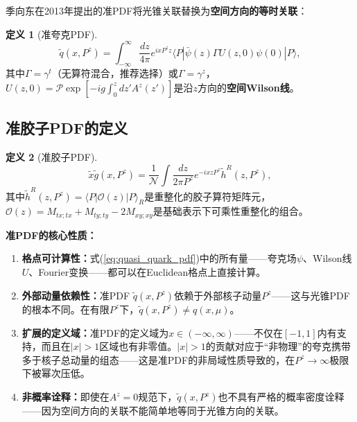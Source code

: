 \documentclass[12pt,a4paper]{ctexart}
\theoremstyle{definition}
\newtheorem{definition}{定义}[section]
\begin{document}
季向东在2013年提出的准PDF\cite{Ji2013Euclidean}将光锥关联替换为\textbf{空间方向的等时关联}：

\begin{definition}[准夸克PDF]
\begin{equation}
\boxed{\tilde{q}(x, P^z) = \int_{-\infty}^{\infty} \frac{dz}{4\pi} e^{ixP^z z} \langle P| \bar{\psi}(z) \Gamma U(z, 0) \psi(0) |P\rangle},
\label{eq:quasi_quark_pdf}
\end{equation}
其中$\Gamma = \gamma^t$（无算符混合，推荐选择\cite{Liu2019isovector}）或$\Gamma = \gamma^z$，$U(z,0) = \mathcal{P}\exp[-ig\int_0^z dz' A^z(z')]$是沿$z$方向的\textbf{空间Wilson线}。
\end{definition}

\subsection{准胶子PDF的定义}

\begin{definition}[准胶子PDF]\cite{Chen2025gluon,Zhang2019}
\begin{equation}
\boxed{\tilde{x}\tilde{g}(x, P^z) = \frac{1}{\mathcal{N}} \int \frac{dz}{2\pi P^z} e^{-ixzP^z} \tilde{h}^R(z, P^z)},
\label{eq:quasi_gluon_pdf}
\end{equation}
其中$\tilde{h}^R(z, P^z) = \langle P|\mathcal{O}(z)|P\rangle_R$是重整化的胶子算符矩阵元，$\mathcal{O}(z) = M_{tx;tx} + M_{ty;ty} - 2M_{xy;xy}$是基础表示下可乘性重整化的组合\cite{Chen2025gluon}。
\end{definition}

\textbf{准PDF的核心性质：}

\begin{enumerate}
    \item \textbf{格点可计算性：}式(\ref{eq:quasi_quark_pdf})中的所有量——夸克场$\psi$、Wilson线$U$、Fourier变换——都可以在Euclidean格点上直接计算。

    \item \textbf{外部动量依赖性：}准PDF $\tilde{q}(x, P^z)$依赖于外部核子动量$P^z$——这与光锥PDF的根本不同。在有限$P^z$下，$\tilde{q}(x, P^z) \neq q(x, \mu)$。

    \item \textbf{扩展的定义域：}准PDF的定义域为$x \in (-\infty, \infty)$——不仅在$[-1,1]$内有支持，而且在$|x| > 1$区域也有非零值。$|x| > 1$的贡献对应于``非物理''的夸克携带多于核子总动量的组态——这是准PDF的非局域性质导致的，在$P^z \to \infty$极限下被幂次压低。

    \item \textbf{非概率诠释：}即使在$A^z = 0$规范下，$\tilde{q}(x, P^z)$也不具有严格的概率密度诠释——因为空间方向的关联不能简单地等同于光锥方向的关联。
\end{enumerate}
\end{document}
